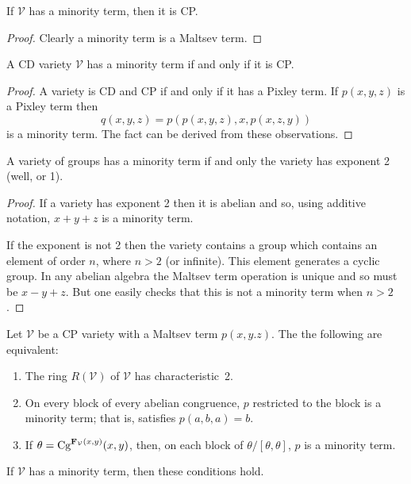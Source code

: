 \begin{fact}
If $\mathcal V$ has a minority term, then it is CP.
\end{fact}

\begin{proof}
Clearly a minority term is a Maltsev term.
\end{proof}

\begin{fact}
A CD variety $\mathcal V$ has a minority term if and
only if it is CP.
\end{fact}

\begin{proof}
A variety is CD and CP if and only if it has a Pixley term. 
If $p(x,y,z)$ is a Pixley term then 
\[
q(x,y,z) = p(p(x,y,z),x,p(x,z,y))
\]
is a minority term. The fact can be derived from these
observations.
\end{proof}

\begin{fact}
A variety of groups has a minority term if and only
the variety has exponent 2 (well, or 1).
\end{fact}

\begin{proof}
If a variety has exponent 2 then it is abelian and so,
using additive notation, $x + y + z$ is a minority term.

If the exponent is not 2 then the variety contains a group
which contains an element of order $n$, where $n > 2$ (or 
infinite). This element generates a cyclic group. In any
abelian algebra the Maltsev term operation is unique and so
must be $x - y + z$. But one easily checks that this is not
a minority term when $n > 2$.
\end{proof}

\begin{lemma}
Let $\mathcal V$ be a CP variety with a Maltsev term $p(x,y.z)$.
The the following are equivalent:
\begin{enumerate}
\item
The ring $R(\mathcal V)$ of $\mathcal V$ has characteristic~2.
\item
On every block of every abelian congruence, $p$ restricted to the 
block is a minority term; that is, satisfies $p(a,b,a) = b$.
\item
If $\theta = \textup{Cg}^{\mathbf{F}_{\mathcal V}(x,y)}(x,y)$, then,
on each block of $\theta/[\theta,\theta]$, $p$ is a minority term.
\end{enumerate}
If $\mathcal V$ has a minority term, then these conditions hold.
\end{lemma}

